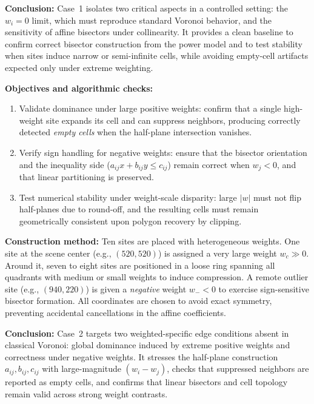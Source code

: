 \documentclass{article}
\begin{document}
\textbf{Conclusion:}
Case~1 isolates two critical aspects in a controlled setting: the $w_i=0$ limit, which must reproduce standard Voronoi behavior, and the sensitivity of affine bisectors under collinearity. It provides a clean baseline to confirm correct bisector construction from the power model and to test stability when sites induce narrow or semi-infinite cells, while avoiding empty-cell artifacts expected only under extreme weighting.


\textbf{Objectives and algorithmic checks:}
\begin{enumerate}
    \item Validate dominance under large positive weights: confirm that a single high-weight site expands its cell and can suppress neighbors, producing correctly detected \emph{empty cells} when the half-plane intersection vanishes.
    \item Verify sign handling for negative weights: ensure that the bisector orientation and the inequality side ($a_{ij}x+b_{ij}y\le c_{ij}$) remain correct when $w_j<0$, and that linear partitioning is preserved.
    \item Test numerical stability under weight-scale disparity: large $|w|$ must not flip half-planes due to round-off, and the resulting cells must remain geometrically consistent upon polygon recovery by clipping.
\end{enumerate}

\textbf{Construction method:}
Ten sites are placed with heterogeneous weights. One site at the scene center (e.g., $(520,520)$) is assigned a very large weight $w_c\!\gg\!0$. Around it, seven to eight sites are positioned in a loose ring spanning all quadrants with medium or small weights to induce compression. A remote outlier site (e.g., $(940,220)$) is given a \emph{negative} weight $w_{-}\!<\!0$ to exercise sign-sensitive bisector formation. All coordinates are chosen to avoid exact symmetry, preventing accidental cancellations in the affine coefficients.

\textbf{Conclusion:}
Case~2 targets two weighted-specific edge conditions absent in classical Voronoi: global dominance induced by extreme positive weights and correctness under negative weights. It stresses the half-plane construction $a_{ij},b_{ij},c_{ij}$ with large-magnitude $(w_i-w_j)$, checks that suppressed neighbors are reported as empty cells, and confirms that linear bisectors and cell topology remain valid across strong weight contrasts.
\end{document}
